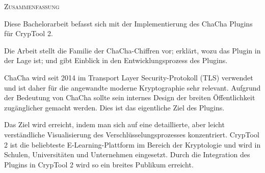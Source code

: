 \begin{center}
  \textsc{Zusammenfassung}
\end{center}
%
\noindent
Diese Bachelorarbeit befasst sich mit der Implementierung des ChaCha Plugins für CrypTool 2.

\medskip
\noindent
Die Arbeit stellt die Familie der ChaCha-Chiffren vor; erklärt, wozu das Plugin in der Lage ist; und gibt Einblick in den Entwicklungsprozess des Plugins.

\medskip
\noindent
ChaCha wird seit 2014 im Transport Layer Security-Protokoll (TLS) verwendet und ist daher für die angewandte moderne Kryptographie sehr relevant. Aufgrund der Bedeutung von ChaCha sollte sein internes Design der breiten Öffentlichkeit zugänglicher gemacht werden. Dies ist das eigentliche Ziel des Plugins.

\medskip
\noindent
Das Ziel wird erreicht, indem man sich auf eine detaillierte, aber leicht verständliche Visualisierung des Verschlüsselungsprozesses konzentriert.
CrypTool 2 ist die beliebteste E-Learning-Plattform im Bereich der Kryptologie und wird in Schulen, Universitäten und Unternehmen eingesetzt. Durch die Integration des Plugins in CrypTool 2 wird so ein breites Publikum erreicht.

